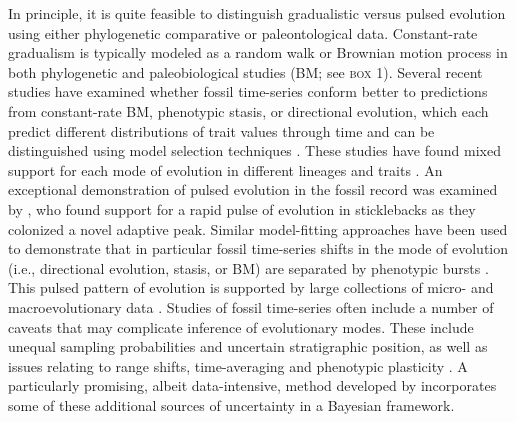 In principle, it is quite feasible to distinguish gradualistic versus pulsed evolution using either phylogenetic comparative or paleontological data. Constant-rate gradualism is typically modeled as a random walk or Brownian motion process in both phylogenetic and paleobiological studies (BM; see \textsc{box 1}). Several recent studies have examined whether fossil time-series conform better to predictions from constant-rate BM, phenotypic stasis, or directional evolution, which each predict different distributions of trait values through time and can be distinguished using model selection techniques \citep{Hunt2012}. These studies have found mixed support for each mode of evolution in different lineages and traits \citep{Hunt2007, Huntetal2008, Hunt2008, Grey2008, Hopkins2012, Hunt2012}. An exceptional demonstration of pulsed evolution in the fossil record was examined by \citet{Huntetal2008}, who found support for a rapid pulse of evolution in sticklebacks as they colonized a novel adaptive peak. Similar model-fitting approaches have been used to demonstrate that in particular fossil time-series shifts in the mode of evolution (i.e., directional evolution, stasis, or BM) are separated by phenotypic bursts \citep{Hunt2008}. This pulsed pattern of evolution is supported by large collections of micro- and macroevolutionary data \citep{EstesArnold2007, Uyeda2011}. Studies of fossil time-series often include a number of caveats that may complicate inference of evolutionary modes. These include unequal sampling probabilities and uncertain stratigraphic position, as well as issues relating to range shifts, time-averaging and phenotypic plasticity \citep{StratPaleobook}. A particularly promising, albeit data-intensive, method developed by \citet{Hannisdal2007} incorporates some of these additional sources of uncertainty in a Bayesian framework.

